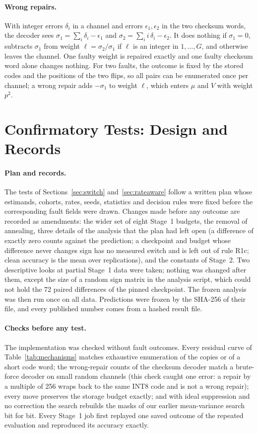 \paragraph{Wrong repairs.} With integer errors $\delta_i$ in a channel and errors $\epsilon_1,\epsilon_2$ in the two checksum words, the decoder sees $\sigma_1=\sum_i\delta_i-\epsilon_1$ and $\sigma_2=\sum_ii\,\delta_i-\epsilon_2$. It does nothing if $\sigma_1=0$, subtracts $\sigma_1$ from weight $\ell=\sigma_2/\sigma_1$ if $\ell$ is an integer in $1,\dots,G$, and otherwise leaves the channel. One faulty weight is repaired exactly and one faulty checksum word alone changes nothing. For two faults, the outcome is fixed by the stored codes and the positions of the two flips, so all pairs can be enumerated once per channel; a wrong repair adds $-\sigma_1$ to weight $\ell$, which enters $\mu$ and $V$ with weight $p^2$.

\section{Confirmatory Tests: Design and Records}\label{app:runr}
\paragraph{Plan and records.} The tests of Sections~\ref{sec:switch} and~\ref{sec:rateaware} follow a written plan whose estimands, cohorts, rates, seeds, statistics and decision rules were fixed before the corresponding fault fields were drawn. Changes made before any outcome are recorded as amendments: the wider set of eight Stage~1 budgets, the removal of annealing, three details of the analysis that the plan had left open (a difference of exactly zero counts against the prediction; a checkpoint and budget whose difference never changes sign has no measured switch and is left out of rule R1c; clean accuracy is the mean over replications), and the constants of Stage~2. Two descriptive looks at partial Stage~1 data were taken; nothing was changed after them, except the size of a random sign matrix in the analysis script, which could not hold the 72 paired differences of the pinned checkpoint. The frozen analysis was then run once on all data. Predictions were frozen by the SHA-256 of their file, and every published number comes from a hashed result file.

\paragraph{Checks before any test.} The implementation was checked without fault outcomes. Every residual curve of Table~\ref{tab:mechanisms} matches exhaustive enumeration of the copies or of a short code word; the wrong-repair counts of the checksum decoder match a brute-force decoder on small random channels (this check caught one error: a repair by a multiple of 256 wraps back to the same INT8 code and is not a wrong repair); every move preserves the storage budget exactly; and with ideal suppression and no correction the search rebuilds the masks of our earlier mean-variance search bit for bit. Every Stage~1 job first replayed one saved outcome of the repeated evaluation and reproduced its accuracy exactly.


